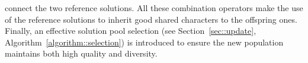 \documentclass[12pt, a4paper]{article}%
\numberwithin{equation}{section}
\theoremstyle{plain}
\begin{document}
connect the two reference solutions. All these combination operators make the use of the reference solutions to inherit good shared characters to the offspring ones.  Finally, an effective solution pool selection (see Section~\ref{sec::update}, Algorithm~\ref{algorithm::selection}) is introduced to ensure the new population maintains both high quality and diversity.
%	
	
	
	
\end{document}
